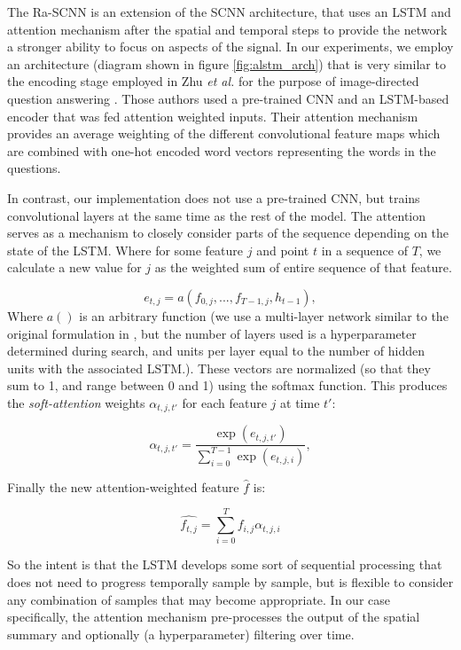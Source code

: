 \documentclass[fleqn,10pt]{wlscirep}
\begin{document}
The Ra-SCNN is an extension of the SCNN architecture, that uses an LSTM and attention mechanism after the spatial and temporal steps to provide the network a stronger ability to focus on aspects of the signal. In our experiments, we employ an architecture (diagram shown in figure \ref{fig:alstm_arch}) that is very similar to the encoding stage employed in Zhu {\em et al.} for the purpose of image-directed question answering \cite{Zhu}. Those authors used a pre-trained CNN and an LSTM-based encoder that was fed attention weighted inputs. Their attention mechanism provides an average weighting of the different convolutional feature maps which are combined with one-hot encoded word vectors representing the words in the questions.

In contrast, our implementation does not use a pre-trained CNN, but trains convolutional layers at the same time as the rest of the model. The attention serves as a mechanism to closely consider parts of the sequence depending on the state of the LSTM. Where for some feature $j$ and point $t$ in a sequence of $T$, we calculate a new value for $j$ as the weighted sum of entire sequence of that feature.  

\begin{equation} 
  e_{t, j} = a(f_{0, j},..., f_{T-1, j}, h_{t-1}),
\end{equation}
Where $a()$ is an arbitrary function (we use a multi-layer network similar to the original formulation in \cite{Zhu}, but the number of layers used is a hyperparameter determined during search, and units per layer equal to the number of hidden units with the associated LSTM.). These vectors are normalized (so that they sum to 1, and range between 0 and 1) using the softmax function. This produces the {\em soft-attention} weights $\alpha_{t,j,t'}$ for each feature $j$ at time $t'$:

\begin{equation} \label{eq:attn_nrg}
  \alpha_{t,j,t'} =  \frac{\exp(e_{t,j,t'})}{\sum_{i=0}^{T-1}\exp(e_{t,j,i})},
\end{equation}

Finally the new attention-weighted feature $\hat{f}$ is: 

\begin{equation} \label{eq:attn}
    \hat{f_{t,j}} = \sum_{i=0}^{T} f_{i,j} \alpha_{t,j,i}
\end{equation}

So the intent is that the LSTM develops some sort of sequential processing that does not need to progress temporally sample by sample, but is flexible to consider any combination of samples that may become appropriate. In our case specifically, the attention mechanism pre-processes the output of the spatial summary and optionally (a hyperparameter) filtering over time.
\end{document}
